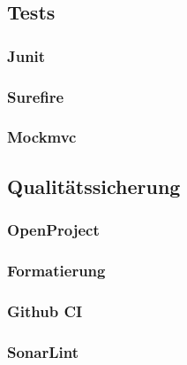 \subsection{Tests}
\subsubsection{Junit}
\subsubsection{Surefire}
\subsubsection{Mockmvc}

\subsection{Qualitätssicherung}
\subsubsection{OpenProject}
\subsubsection{Formatierung}
\subsubsection{Github CI}
\subsubsection{SonarLint}

